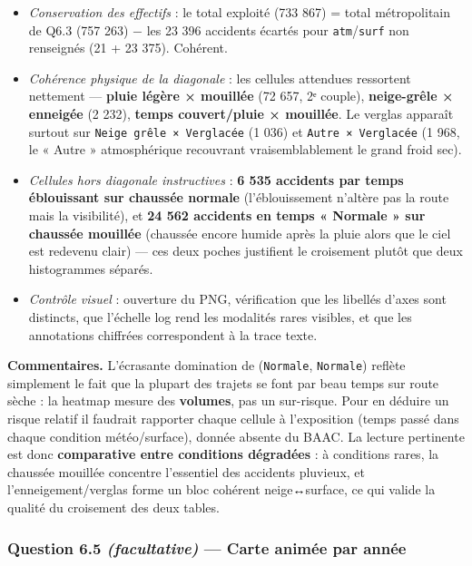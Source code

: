 \documentclass[11pt,a4paper]{article}
\newcommand{\rub}[2]{\textbf{\textcolor{#1}{#2}}}
\begin{document}
\begin{itemize}
\item \emph{Conservation des effectifs} : le total exploité (733 867) = total métropolitain de Q6.3 (757 263) − les 23 396 accidents écartés pour \texttt{atm}/\texttt{surf} non renseignés (21 + 23 375). Cohérent.
\item \emph{Cohérence physique de la diagonale} : les cellules attendues ressortent nettement — \textbf{pluie légère × mouillée} (72 657, 2ᵉ couple), \textbf{neige-grêle × enneigée} (2 232), \textbf{temps couvert/pluie × mouillée}. Le verglas apparaît surtout sur \texttt{Neige grêle × Verglacée} (1 036) et \texttt{Autre × Verglacée} (1 968, le « Autre » atmosphérique recouvrant vraisemblablement le grand froid sec).
\item \emph{Cellules hors diagonale instructives} : \textbf{6 535 accidents par temps éblouissant sur chaussée normale} (l'éblouissement n'altère pas la route mais la visibilité), et \textbf{24 562 accidents en temps « Normale » sur chaussée mouillée} (chaussée encore humide après la pluie alors que le ciel est redevenu clair) — ces deux poches justifient le croisement plutôt que deux histogrammes séparés.
\item \emph{Contrôle visuel} : ouverture du PNG, vérification que les libellés d'axes sont distincts, que l'échelle log rend les modalités rares visibles, et que les annotations chiffrées correspondent à la trace texte.
\end{itemize}

\rub{labcomment}{Commentaires.} L'écrasante domination de (\texttt{Normale}, \texttt{Normale}) reflète simplement le fait que la plupart des trajets se font par beau temps sur route sèche : la heatmap mesure des \textbf{volumes}, pas un sur-risque. Pour en déduire un risque relatif il faudrait rapporter chaque cellule à l'exposition (temps passé dans chaque condition météo/surface), donnée absente du BAAC. La lecture pertinente est donc \textbf{comparative entre conditions dégradées} : à conditions rares, la chaussée mouillée concentre l'essentiel des accidents pluvieux, et l'enneigement/verglas forme un bloc cohérent neige↔surface, ce qui valide la qualité du croisement des deux tables.

\clearpage
\subsubsection*{Question 6.5 \emph{(facultative)} — Carte animée par année}
\end{document}

